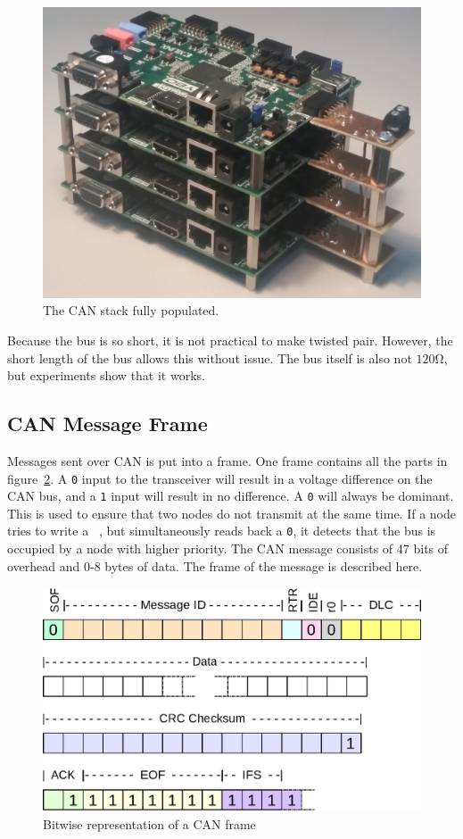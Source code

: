 \begin{figure}[H]
	\centering
	\includegraphics[width = 0.6\linewidth]{graphics/CAN_stack_picture}
	\caption{The CAN stack fully populated.}
	\label{fig:CAN_stack_picture}
\end{figure}

Because the bus is so short, it is not practical to make twisted pair.
However, the short length of the bus allows this without issue.
The bus itself is also not $120 \si{\ohm}$, but experiments show that it works.

\subsection{CAN Message Frame}\label{sub:CanMessageFrame}
Messages sent over CAN is put into a frame. 
One frame contains all the parts in figure~\ref{fig:CAN_frame_pdf}.
A \texttt{0} input to the transceiver will result in a voltage difference on the CAN bus, and a \texttt{1} input will result in no difference. 
A \texttt{0} will always be dominant.
This is used to ensure that two nodes do not transmit at the same time.
If a node tries to write a \texttt{	}, but simultaneously reads back a \texttt{0}, it detects that the bus is occupied by a node with higher priority.
The CAN message consists of 47 bits of overhead and 0-8 bytes of data. 
The frame of the message is described here.

\begin{figure}[h!]
	\centering
	\includegraphics[width = 0.9\linewidth]{graphics/CAN_frame}
	\caption{Bitwise representation of a CAN frame}
	\label{fig:CAN_frame_pdf}
\end{figure}

